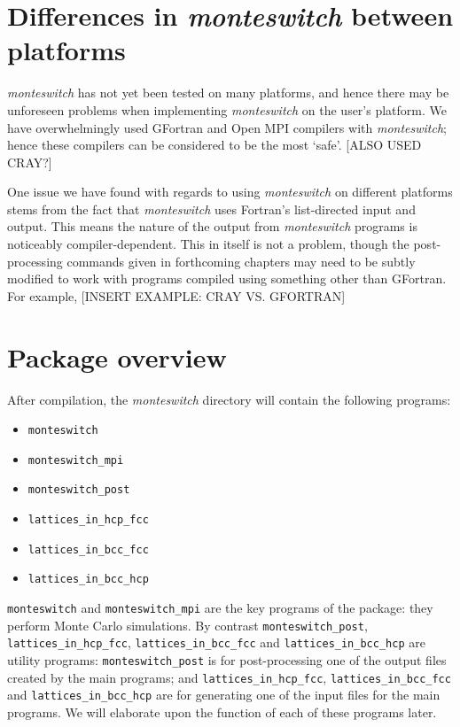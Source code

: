\documentclass{report}
\begin{document}
\section{Differences in \emph{monteswitch} between platforms}
\emph{monteswitch} has not yet been tested on many platforms, and hence there may be unforeseen problems when implementing \emph{monteswitch} on
the user's platform. We have overwhelmingly used GFortran and Open MPI compilers with \emph{monteswitch}; hence these compilers can be considered 
to be the most `safe'. [ALSO USED CRAY?]

One issue we have found with regards to using \emph{monteswitch} on different platforms stems from the fact that \emph{monteswitch} uses Fortran's 
list-directed input and output. This means the nature of the output from \emph{monteswitch} programs is noticeably compiler-dependent. This in itself
is not a problem, though the post-processing commands given in forthcoming chapters may need to be subtly modified to work with programs compiled using 
something other than GFortran. For example, [INSERT EXAMPLE: CRAY VS. GFORTRAN]


\section{Package overview}
After compilation, the \emph{monteswitch} directory will contain the following programs:
\begin{itemize}
\item\texttt{monteswitch}
\item\texttt{monteswitch\_mpi}
\item\texttt{monteswitch\_post}
\item\texttt{lattices\_in\_hcp\_fcc}
\item\texttt{lattices\_in\_bcc\_fcc}
\item\texttt{lattices\_in\_bcc\_hcp}
\end{itemize}
\texttt{monteswitch} and \texttt{monteswitch\_mpi} are the key programs of the package: they perform Monte Carlo simulations. 
By contrast \texttt{monteswitch\_post}, \texttt{lattices\_in\_hcp\_fcc}, \texttt{lattices\_in\_bcc\_fcc} and 
\texttt{lattices\_in\_bcc\_hcp} are utility programs: \texttt{monteswitch\_post} is for post-processing one of the output files created 
by the main programs; and \texttt{lattices\_in\_hcp\_fcc}, \texttt{lattices\_in\_bcc\_fcc} and \texttt{lattices\_in\_bcc\_hcp} are for generating 
one of the input files for the main programs. We will elaborate upon the function of each of these programs later.
\end{document}
